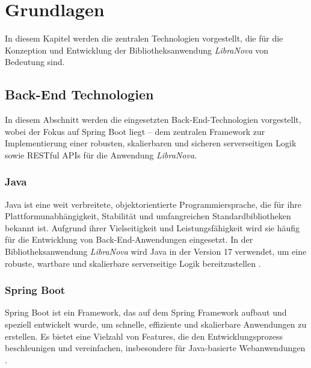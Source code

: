 \chapter{Grundlagen}

In diesem Kapitel werden die zentralen Technologien vorgestellt, die für die Konzeption und Entwicklung der Bibliotheksanwendung \textit{LibraNova} von Bedeutung sind.

\section{Back-End Technologien}

In diesem Abschnitt werden die eingesetzten Back-End-Technologien vorgestellt, wobei der Fokus auf Spring Boot liegt – dem zentralen Framework zur Implementierung einer robusten, skalierbaren und sicheren serverseitigen Logik sowie RESTful APIs für die Anwendung \textit{LibraNova}.

\subsection{Java}

Java ist eine weit verbreitete, objektorientierte Programmiersprache, die für ihre Plattformunabhängigkeit, Stabilität und umfangreichen Standardbibliotheken bekannt ist. Aufgrund ihrer Vielseitigkeit und Leistungsfähigkeit wird sie häufig für die Entwicklung von Back-End-Anwendungen eingesetzt. In der Bibliotheksanwendung \textit{LibraNova} wird Java in der Version 17 verwendet, um eine robuste, wartbare und skalierbare serverseitige Logik bereitzustellen \cite{ORACLE2025a}.

\subsection{Spring Boot}

Spring Boot ist ein Framework, das auf dem Spring Framework aufbaut und speziell entwickelt wurde, um schnelle, effiziente und skalierbare Anwendungen zu erstellen. Es bietet eine Vielzahl von Features, die den Entwicklungsprozess beschleunigen und vereinfachen, insbesondere für Java-basierte Webanwendungen \cite{SPRINGBOOT2025a}.

